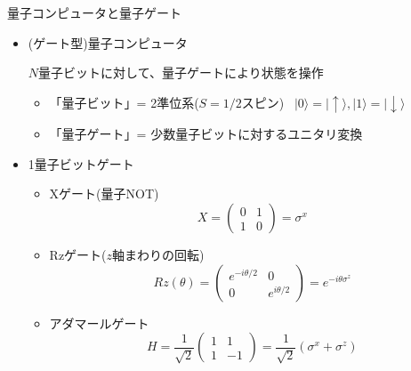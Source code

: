 \begin{frame}[t,fragile]{量子コンピュータと量子ゲート}
  \begin{itemize}
  \item (ゲート型)量子コンピュータ

    $N$量子ビットに対して、量子ゲートにより状態を操作

    \begin{itemize}
    \item 「量子ビット」= 2準位系($S=1/2$スピン) \ $|0\rangle=|\!\uparrow\rangle, |1\rangle=|\!\downarrow\rangle$
    \item 「量子ゲート」= 少数量子ビットに対するユニタリ変換
    \end{itemize}
  \item 1量子ビットゲート
    \begin{itemize}
    \item Xゲート(量子NOT)
      \[
      X = \begin{pmatrix} 0 & 1 \\ 1 & 0 \end{pmatrix} = \sigma^x
      \]
    \item Rzゲート($z$軸まわりの回転)
      \[
      Rz(\theta) = \begin{pmatrix} e^{-i\theta/2} & 0 \\ 0 & e^{i\theta/2} \end{pmatrix} = e^{-i\theta\sigma^z}
      \]
    \item アダマールゲート
      \[
      H = \frac{1}{\sqrt{2}} \begin{pmatrix} 1 & 1 \\ 1 & -1 \end{pmatrix} = \frac{1}{\sqrt{2}} (\sigma^x + \sigma^z)
      \]
    \end{itemize}
  \end{itemize}
\end{frame}
